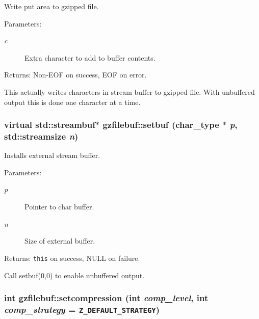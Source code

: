 Write put area to gzipped file. 

\begin{Desc}
\item[Parameters:]
\begin{description}
\item[{\em c}]Extra character to add to buffer contents. \end{description}
\end{Desc}
\begin{Desc}
\item[Returns:]Non-EOF on success, EOF on error.\end{Desc}
This actually writes characters in stream buffer to gzipped file. With unbuffered output this is done one character at a time. 
\subsubsection{\setlength{\rightskip}{0pt plus 5cm}virtual std::streambuf$\ast$ gzfilebuf::setbuf (char\_\-type $\ast$ {\em p}, std::streamsize {\em n})\hspace{0.3cm}{\tt  [protected, virtual]}}\label{classgzfilebuf_cb20c511ac82f7a2abfb065e03ecefb4}


Installs external stream buffer. 

\begin{Desc}
\item[Parameters:]
\begin{description}
\item[{\em p}]Pointer to char buffer. \item[{\em n}]Size of external buffer. \end{description}
\end{Desc}
\begin{Desc}
\item[Returns:]{\tt this} on success, NULL on failure.\end{Desc}
Call setbuf(0,0) to enable unbuffered output. 
\subsubsection{\setlength{\rightskip}{0pt plus 5cm}int gzfilebuf::setcompression (int {\em comp\_\-level}, int {\em comp\_\-strategy} = {\tt Z\_\-DEFAULT\_\-STRATEGY})}\label{classgzfilebuf_9b44d18d92cb81b0c712d032e84498f0}


